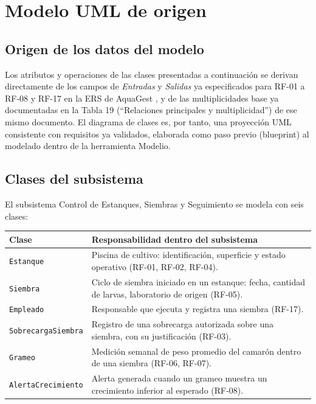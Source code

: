 \documentclass[11pt,a4paper]{article}
\begin{document}
\section{Modelo UML de origen}
\label{sec:modelo-uml}

\subsection{Origen de los datos del modelo}
Los atributos y operaciones de las clases presentadas a continuación se derivan
directamente de los campos de \textit{Entradas} y \textit{Salidas} ya
especificados para RF-01 a RF-08 y RF-17 en la ERS de AquaGest
\cite{aquagest2026}, y de las multiplicidades base ya documentadas en la Tabla 19
(``Relaciones principales y multiplicidad'') de ese mismo documento. El diagrama
de clases es, por tanto, una proyección UML consistente con requisitos ya
validados, elaborada como paso previo (blueprint) al modelado dentro de la
herramienta Modelio.

\subsection{Clases del subsistema}
El subsistema Control de Estanques, Siembras y Seguimiento se modela con seis
clases:

\begin{center}
\begin{tabularx}{\linewidth}{lX}
\toprule
\textbf{Clase} & \textbf{Responsabilidad dentro del subsistema} \\
\midrule
\texttt{Estanque} & Piscina de cultivo: identificación, superficie y estado
operativo (RF-01, RF-02, RF-04). \\
\texttt{Siembra} & Ciclo de siembra iniciado en un estanque: fecha, cantidad de
larvas, laboratorio de origen (RF-05). \\
\texttt{Empleado} & Responsable que ejecuta y registra una siembra (RF-17). \\
\texttt{SobrecargaSiembra} & Registro de una sobrecarga autorizada sobre una
siembra, con su justificación (RF-03). \\
\texttt{Grameo} & Medición semanal de peso promedio del camarón dentro de una
siembra (RF-06, RF-07). \\
\texttt{AlertaCrecimiento} & Alerta generada cuando un grameo muestra un
crecimiento inferior al esperado (RF-08). \\
\bottomrule
\end{tabularx}
\end{center}
\end{document}

